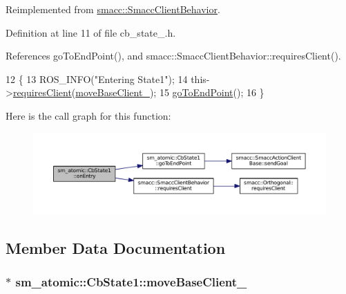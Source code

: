 Reimplemented from \hyperlink{classsmacc_1_1SmaccClientBehavior_a7962382f93987c720ad432fef55b123f}{smacc\+::\+Smacc\+Client\+Behavior}.



Definition at line 11 of file cb\+\_\+state\+\_.\+h.



References go\+To\+End\+Point(), and smacc\+::\+Smacc\+Client\+Behavior\+::requires\+Client().


\begin{DoxyCode}
12     \{
13         ROS\_INFO(\textcolor{stringliteral}{"Entering State1"});
14         this->\hyperlink{classsmacc_1_1SmaccClientBehavior_adc21bbd45d36bd81ca6f778ed161807a}{requiresClient}(\hyperlink{structsm__atomic_1_1CbState1_a8b4b01655654c03cd1f01ad7cf3feb02}{moveBaseClient\_});
15         \hyperlink{structsm__atomic_1_1CbState1_ae27f060a983c1128d3c928eed45eae6b}{goToEndPoint}();
16     \}
\end{DoxyCode}


Here is the call graph for this function\+:
\nopagebreak
\begin{figure}[H]
\begin{center}
\leavevmode
\includegraphics[width=350pt]{structsm__atomic_1_1CbState1_afdd883f27c415d8485658c74fae1008e_cgraph}
\end{center}
\end{figure}




\subsection{Member Data Documentation}
\subsubsection[{\texorpdfstring{move\+Base\+Client\+\_\+}{moveBaseClient_}}]{$\ast$ sm\+\_\+atomic\+::\+Cb\+State1\+::move\+Base\+Client\+\_\+}\hypertarget{structsm__atomic_1_1CbState1_a8b4b01655654c03cd1f01ad7cf3feb02}{}\label{structsm__atomic_1_1CbState1_a8b4b01655654c03cd1f01ad7cf3feb02}


